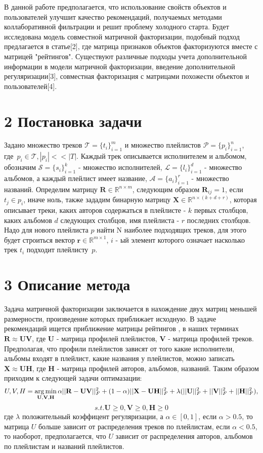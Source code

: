 \documentclass[12pt,twoside]{article}
\begin{document}
В данной работе предполагается, что использование свойств объектов и пользователей улучшит качество рекомендаций, получаемых методами коллаборативной фильтрации и  решит проблему  холодного старта. Будет исследована модель совместной матричной факторизации, подобный подход предлагается в статье[2], где матрица признаков объектов факторизуются вместе с матрицей "рейтингов". Существуют различные подходы учета дополнительной информации в модели матричной факторизации, введение дополнительной регуляризации[3], совместная факторизация с матрицами похожести объектов и пользователей[4]. 

\section{2 Постановка задачи}

Задано множество треков $\mathcal{T} = \{t_i\}_{i=1}^m$ и множество плейлистов $\mathcal{P} = \{p_i\}_{i=1}^{n}$, где~$p_i \in \mathcal{T}, |p_i| << |T|$. Каждый трек описывается исполнителем и альбомом, обозначим $\mathcal{S} = \{s_i\}_{i=1}^{k}$ - множество исполнителей, $\mathcal{L} = \{l_i\}_{i=1}^d$ - множество альбомов, а каждый плейлист имеет название, $\mathcal{A} = \{a_i\}_{i=1}^{r}$ - множество названий. Определим матрицу $\mathbf{R} \in \mathbb{R}^{n \times m}$, следующим образом $\mathbf{R}_{ij} = 1$, если $t_j \in p_i$, иначе ноль, также зададим бинарную матрицу $\mathbf{X} \in \mathbb{R}^{n \times (k + d + r)}$, которая описывает треки, каких авторов содержаться в плейлисте - $k$ первых столбцов, каких альбомов $d$ следующих столбцов, имя плейлиста - $r$ последних столбцов. Надо для нового плейлиста $p$ найти N наиболее подходящих треков, для этого будет строиться вектор $\mathbf{r} \in \mathbb{R}^{m \times 1}$, $i$ - ый элемент которого означает насколько трек $t_i$ подходит плейлисту~$p$.

\section{3 Описание метода}

Задача матричной факторизации заключается в нахождение двух матриц меньшей размерности, произведение которых приближает исходную. В задаче рекомендаций ищется приближение матрицы рейтингов , в наших терминах  $\mathbf{R} \approx \mathbf{UV}$, где $\mathbf{U}$ - матрица профилей плейлистов, $\mathbf{V}$ - матрица профилей треков. Предполагая, что профили плейлистов зависят от того какие исполнители, альбомы входят в плейлист, какие названия у плейлистов, можно записать $\mathbf{X} \approx \mathbf{UH}$, где $\mathbf{H}$ - матрица профилей авторов, альбомов, названий. Таким образом приходим к следующей задачи оптимазации:
$$U, V, H = \argmin_{\mathbf{U, V, H}}\alpha||\mathbf{R} - \mathbf{UV}||_F^2 +(1 - \alpha) ||\mathbf{X} - \mathbf{UH}||_F^2 + \lambda(||\mathbf{U}||_F^2 + ||\mathbf{V}||_F^2 + ||\mathbf{H}||_F^2),$$
$$ s.t. \mathbf{U} \geq 0,  \mathbf{V} \geq 0,  \mathbf{H} \geq 0$$
где $\lambda$ положительный коэффицент регуляризации, а $\alpha \in [0, 1]$, если $\alpha > 0.5$, то матрица $U$ больше зависит от распределения треков по плейлистам, если $\alpha < 0.5$, то наоборот, предполагается, что $U$ зависит от распределения авторов, альбомов по плейлистам и названий плейлистов. 
\end{document}
